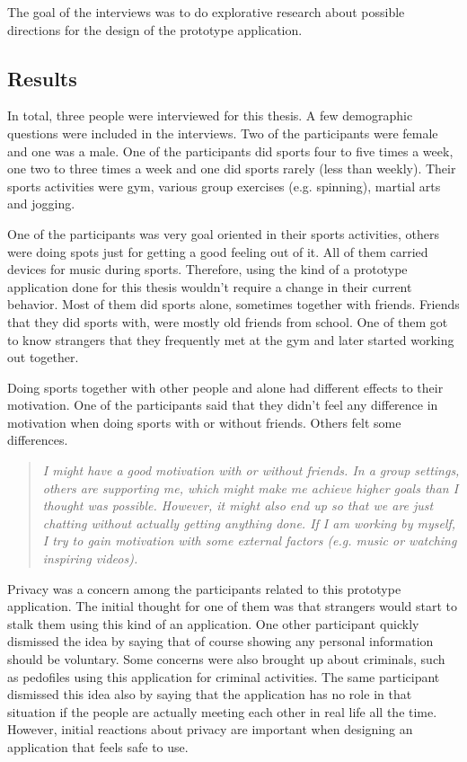The goal of the interviews was to do explorative research about possible directions for the design of the prototype application.

\subsection{Results}

In total, three people were interviewed for this thesis. A few demographic questions were included in the interviews. Two of the participants were female and one was  a male. One of the participants did sports four to five times a week, one two to three times a week and one did sports rarely (less than weekly). Their sports activities were gym, various group exercises (e.g. spinning), martial arts and jogging.

One of the participants was very goal oriented in their sports activities, others were doing spots just for getting a good feeling out of it. All of them carried devices for music during sports. Therefore, using the kind of a prototype application done for this thesis wouldn't require a change in their current behavior. Most of them did sports alone, sometimes together with friends. Friends that they did sports with, were mostly old friends from school. One of them got to know strangers that they frequently met at the gym and later started working out together.

Doing sports together with other people and alone had different effects to their motivation. One of the participants said that they didn't feel any difference in motivation when doing sports with or without friends. Others felt some differences.

\begin{quotation}
\it I might have a good motivation with or without friends. In a group settings, others are supporting me, which might make me achieve higher goals than I thought was possible. However, it might also end up so that we are just chatting without actually getting anything done. If I am working by myself, I try to gain motivation with some external factors (e.g. music or watching inspiring videos).
\end{quotation}

Privacy was a concern among the participants related to this prototype application. The initial thought for one of them was that strangers would start to stalk them using this kind of an application. One other participant quickly dismissed the idea by saying that of course showing any personal information should be voluntary. Some concerns were also brought up about criminals, such as pedofiles using this application for criminal activities. The same participant dismissed this idea also by saying that the application has no role in that situation if the people are actually meeting each other in real life all the time. However, initial reactions about privacy are important when designing an application that feels safe to use.

